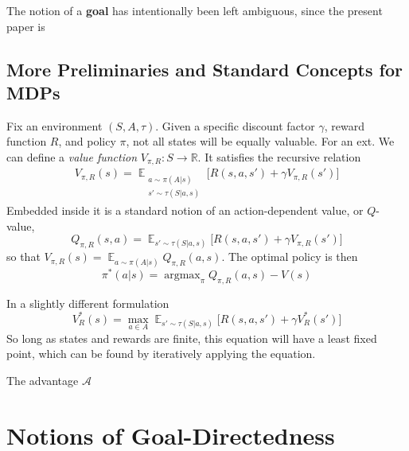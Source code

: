\documentclass{article}
\DeclareMathOperator*{\argmax}{\arg\max}
\DeclareMathOperator*{\Ex}{\mathbb E}
\begin{document}
    The notion of a \textbf{goal} has intentionally been left ambiguous, since the present paper is







    \subsection{More Preliminaries and Standard Concepts for MDPs}
    Fix an environment $(S,A,\tau)$.
    Given a specific discount factor $\gamma$, reward function $R$, and policy $\pi$, not all states will be equally valuable. For an ext.
    We can define a \emph{value function} $V_{\pi, R} : S \to \mathbb R$.
    It satisfies the recursive relation
    \begin{align*}
        V_{\pi,R}(s) = \Ex_{ \substack{ a \sim \pi(A|s) \\ s' \sim \tau(S|a,s) }}
            \Big[ R(s,a,s') + \gamma V_{\pi, R}(s') \Big]
    \end{align*}
    Embedded inside it is a standard notion of an action-dependent value, or $Q$-value,
    \[
        Q_{\pi,R}(s,a) = \Ex_{ s' \sim \tau(S|a,s) } \Big[ R(s,a,s') + \gamma V_{\pi, R}(s') \Big]
    \]
    so that $V_{\pi,R}(s) = \Ex_{a \sim \pi(A|s)} Q_{\pi,R}(a,s)$.
    The optimal policy is then
    \[
        \pi^*(a|s) = \argmax_{\pi} Q_{\pi,R}(a,s) - V(s)
    \]


    In a slightly different formulation
    \[
        V^*_R(s)  = \max_{a \in A} \Ex_{ s' \sim \tau(S|a,s) } \Big[ R(s,a,s') + \gamma V^*_{R}(s') \Big]
    \]
    So long as states and rewards are finite, this equation will have a least fixed point, which can be found by iteratively applying the equation.

    The advantage $\mathcal A$

    \section{Notions of Goal-Directedness}
\end{document}
